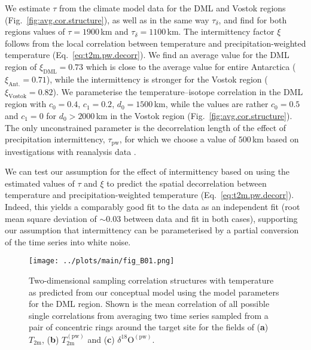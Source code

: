 \documentclass[cp, manuscript, draft]{copernicus}
\begin{document}
We estimate $\tau$ from the climate model data for the DML and Vostok regions
(Fig.~\ref{fig:avg.cor.structure}), as well as in the same way
$\tau_{\delta}$, and find for both regions values of $\tau=1900$\,km and
$\tau_{\delta}=1100$\,km. The intermittency factor $\xi$ follows from the
local correlation between temperature and precipitation-weighted temperature
(Eq.~\ref{eq:t2m.pw.decorr}). We find an average value for the DML region of
$\xi_{\mathrm{DML}}=0.73$ which is close to the average value for entire
Antarctica ($\xi_{\mathrm{Ant.}}=0.71$), while the intermittency is stronger for
the Vostok region ($\xi_{\mathrm{Vostok}}=0.82$). We parameterise the
temperature--isotope correlation in the DML region with $c_0=0.4$, $c_1=0.2$,
$d_0=1500$\,km, while the values are rather $c_0=0.5$ and $c_1=0$ for
$d_0>2000$\,km in the Vostok region (Fig.~\ref{fig:avg.cor.structure}). The only
unconstrained parameter is the decorrelation length of the effect of
precipitation intermittency, $\tau_{\mathrm{pw}}$, for which we choose a value
of $500$\,km based on investigations with reanalysis data \citep{Munch2018a}.

We can test our assumption for the effect of intermittency based on using the
estimated values of $\tau$ and $\xi$ to predict the spatial decorrelation
between temperature and precipitation-weighted temperature
(Eq.~\ref{eq:t2m.pw.decorr}). Indeed, this yields a comparably good fit to the
data as an independent fit (root mean square deviation of $\sim0.03$ between
data and fit in both cases), supporting our assumption that intermittency can be
parameterised by a partial conversion of the time series into white noise.

\begin{figure*}[t]%
\centering
\texttt{[image: ../plots/main/fig\_B01.png]}
\caption{%
  Two-dimensional sampling correlation structures with temperature as predicted
  from our conceptual model using the model parameters for the DML region. Shown
  is the mean correlation of all possible single correlations from averaging two
  time series sampled from a pair of concentric rings around the target site for
  the fields of (\textbf{a}) $T_{\mathrm{2m}}$, (\textbf{b})
  $T_{\mathrm{2m}}^{\mathrm{(pw)}}$ and (\textbf{c})
  $\delta^{18}\mathrm{O}^{\mathrm{(pw)}}$.}
\label{fig:conceptual.model}%
\end{figure*}%
\end{document}
